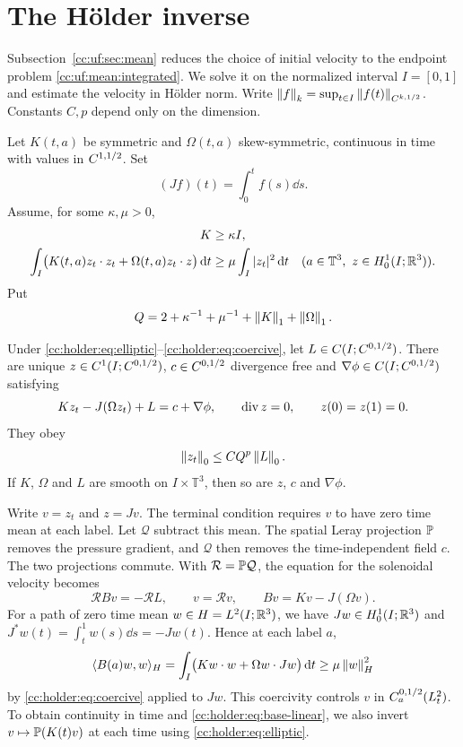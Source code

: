 \section{The H\"older inverse}\label{cc:app:mean}
Subsection~\ref{cc:uf:sec:mean} reduces the choice of initial velocity to
the endpoint problem \eqref{cc:uf:mean:integrated}. We solve it on the
normalized interval $I=[0,1]$ and estimate the velocity in H\"older norm. Write
$\left\lVert f\right\rVert_k=\sup_{t\in I}\left\lVert f(t)\right\rVert_{C^{k,1/2}}$.
Constants $C,p$ depend only on the dimension.

Let $K(t,a)$ be symmetric and $\Omega(t,a)$ skew-symmetric, continuous in time with
values in $C^{1,1/2}$. Set
\[
 (Jf)(t)=\int_0^t f(s)\dd s.
\]
Assume, for some $\kappa,\mu>0$,
\begin{align}
 K&\ge\kappa I,\label{cc:holder:eq:elliptic}\\
 \int_I\bigl(K(t,a)z_t\cdot z_t+\Omega(t,a)z_t\cdot z\bigr)\,\mathrm d t
 &\ge\mu\int_I|z_t|^2\,\mathrm d t
 \quad(a\in\mathbb T^3,\ z\in H^1_0(I;\mathbb R^3)).
 \label{cc:holder:eq:coercive}
\end{align}
Put
\[
 Q=2+\kappa^{-1}+\mu^{-1}+\left\lVert K\right\rVert_1+\left\lVert\Omega\right\rVert_1.
\]

\begin{theorem}\label{cc:holder:linear}
Under \eqref{cc:holder:eq:elliptic}--\eqref{cc:holder:eq:coercive},
let $L\in C(I;C^{0,1/2})$. There are unique
$z\in C^1(I;C^{0,1/2})$, $c\in C^{0,1/2}$ divergence free and
$\nabla\phi\in C(I;C^{0,1/2})$ satisfying
\[
 Kz_t-J(\Omega z_t)+L=c+\nabla\phi,
 \qquad \operatorname{div} z=0,\qquad z(0)=z(1)=0.
\]
They obey
\begin{equation}\label{cc:holder:eq:base-linear}
 \left\lVert z_t\right\rVert_0\le CQ^p\left\lVert L\right\rVert_0.
\end{equation}
If $K$, $\Omega$ and $L$ are smooth on $I\times\mathbb T^3$, then so are
$z$, $c$ and $\nabla\phi$.
\end{theorem}

Write $v=z_t$ and $z=Jv$. The terminal condition requires $v$ to have
zero time mean at each label. Let $\mathcal Q$ subtract this mean.
The spatial Leray projection $\mathbb P$ removes the pressure gradient, and
$\mathcal Q$ then removes the time-independent field $c$. The two
projections commute. With $\mathcal R=\mathbb P\mathcal Q$, the equation for
the solenoidal velocity becomes
\[
 \mathcal R Bv=-\mathcal R L,\qquad v=\mathcal Rv,\qquad
 Bv=Kv-J(\Omega v).
\]
For a path of zero time mean $w\in H=L^2(I;\mathbb R^3)$, we have
$Jw\in H^1_0(I;\mathbb R^3)$ and $J^*w(t)=\int_t^1 w(s)\dd s=-Jw(t)$.
Hence at each label $a$,
\[
 \langle B(a)w,w\rangle_H
 =\int_I\bigl(Kw\cdot w+\Omega w\cdot Jw\bigr)\,\mathrm d t
 \ge\mu\left\lVert w\right\rVert_H^2
\]
by \eqref{cc:holder:eq:coercive} applied to $Jw$.
This coercivity controls $v$ in $C^{0,1/2}_a(L^2_t)$. To obtain
continuity in time and \eqref{cc:holder:eq:base-linear}, we also invert
$v\mapsto\mathbb P(K(t)v)$ at each time using \eqref{cc:holder:eq:elliptic}.

